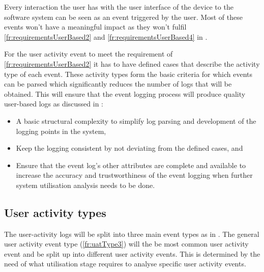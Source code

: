 Every interaction the user has with the user interface of the device to the software system can be seen as an event triggered by the user. Most of these events won't have a meaningful impact as they won't fulfil \ref{fr:requirementsUserBased2} and \ref{fr:requirementsUserBased4} in .\par For the user activity event to meet the requirement of \ref{fr:requirementsUserBased2} it has to have defined cases that describe the activity type of each event. These activity types form the basic criteria for which events can be parsed which significantly reduces the number of logs that will be obtained. This will ensure that the event logging process will produce quality user-based logs as discussed in :

\begin{itemize}
	\item A basic structural complexity to simplify log parsing and development of the logging points in the system,
	\item Keep the logging consistent by not deviating from the defined cases, and
	\item Ensure that the event log's other attributes are complete and available to increase the accuracy and trustworthiness of the event logging when further system utilisation analysis needs to be done. 
\end{itemize}

\subsection{User activity types}\label{sec:ch2_userActivityTypes}
The user-activity logs will be split into three main event types as in . The general user activity event type (\ref{fr:uatType3}) will the be most common user activity event and be split up into different user activity events. This is determined by the need of what utilisation stage requires to analyse specific user activity events. 

